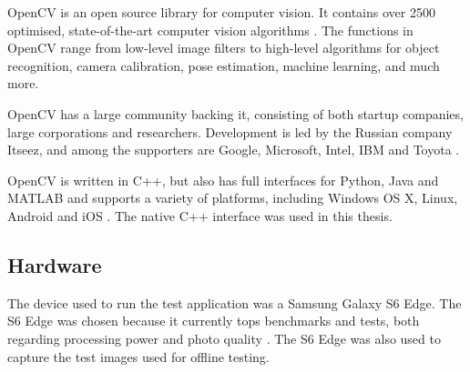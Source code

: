 OpenCV is an open source library for computer vision.
It contains over 2500 optimised, state-of-the-art computer vision algorithms \cite{opencv_about}.
The functions in OpenCV range from low-level image filters to high-level algorithms for object recognition, camera calibration, pose estimation, machine learning, and much more.

OpenCV has a large community backing it, consisting of both startup companies, large corporations and researchers.
Development is led by the Russian company Itseez, and among the supporters are Google, Microsoft, Intel, IBM and Toyota \cite{opencv_about}. 

OpenCV is written in C++, but also has full interfaces for Python, Java and MATLAB and supports a variety of platforms, including Windows OS X, Linux, Android and iOS \cite{opencv_about}.
The native C++ interface was used in this thesis.

\subsection{Hardware}
The device used to run the test application was a Samsung Galaxy S6 Edge.
The S6 Edge was chosen because it currently tops benchmarks and tests, both regarding processing power and photo quality \cite{phone_performance_benchmark}\cite{phone_camera_benchmark}.
The S6 Edge was also used to capture the test images used for offline testing.
